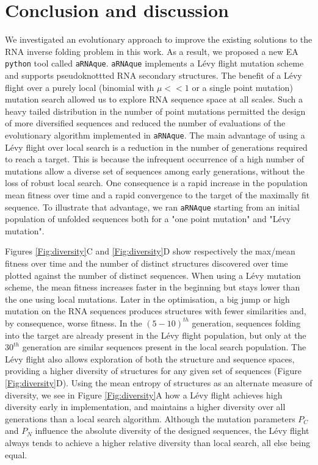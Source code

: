 \section{Conclusion and discussion}
We investigated an evolutionary approach to improve the existing solutions to the RNA inverse folding problem in this work. As a result, we proposed a new EA \texttt{python} tool called \texttt{aRNAque}.  \texttt{aRNAque} implements a Lévy flight mutation scheme and supports pseudoknottted RNA secondary structures. The benefit of a Lévy flight over a purely local (binomial with $\mu<<1$ or a single point mutation) mutation search allowed us to explore RNA sequence space at all scales. Such a heavy tailed distribution in the number of point mutations permitted the design of more diversified sequences and reduced the number of evaluations of the evolutionary algorithm implemented in \texttt{aRNAque}. The main advantage of using a Lévy flight over local search is a reduction in the number of generations required to reach a target. This is because the infrequent occurrence of a high number of mutations allow a diverse set of sequences among early generations, without the loss of robust local search. One consequence is a rapid increase in the population mean fitness over time and a rapid convergence to the target of the maximally fit sequence. To illustrate that advantage, we ran \texttt{aRNAque} starting from an initial population of unfolded sequences both for a "one point mutation" and "Lévy mutation".

Figures  \ref{Fig:diversity}C and  \ref{Fig:diversity}D show respectively the max/mean fitness over time and the number of distinct structures discovered over time plotted against the number of distinct sequences. When using a Lévy mutation scheme, the mean fitness increases faster in the beginning but stays lower than the one using local mutations. Later in the optimisation, a big jump or high mutation on the RNA sequences produces structures with fewer similarities and, by consequence, worse fitness. In the $(5-10)^{th}$ generation, sequences folding into the target are already present in the Lévy flight population, but only at the $30^{th}$ generation are similar sequences present in the local search population. The Lévy flight also allows exploration of both the structure and sequence spaces, providing a higher diversity of structures for any given set of sequences (Figure \ref{Fig:diversity}D). Using the mean entropy of structures as an alternate measure of diversity, we see in Figure \ref{Fig:diversity}A how a Lévy flight achieves high diversity early in implementation, and maintains a higher diversity over all generations than a local search algorithm. Although the mutation parameters $P_C$ and $P_N$ influence the absolute diversity of the designed sequences, the Lévy flight always tends to achieve a higher relative diversity than local search, all else being equal. 

